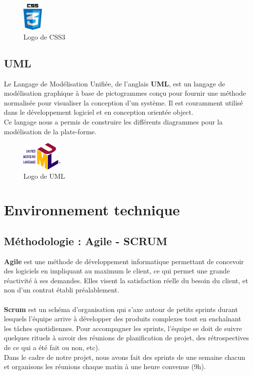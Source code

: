 \documentclass[12pt]{report}
\begin{document}
	    \begin{figure}[H]
	      \begin{center}
		\includegraphics[scale=0.3, width=1cm]{images/logoCss.png}
		\caption{Logo de CSS3}
	      \end{center}
	    \end{figure}

	  \subsection{UML}
	    Le Langage de Modélisation Unifiée, de l'anglais \textbf{UML}, est un langage de modélisation graphique à base de pictogrammes conçu pour fournir une méthode normalisée pour visualiser la conception d'un système. Il est couramment utilisé dans le développement logiciel et en conception orientée object.\cite{uml}
	    \\Ce langage nous a permis de construire les différents diagrammes pour la modélisation de la plate-forme.
	    
	    \begin{figure}[H]
	      \begin{center}
		\includegraphics[scale=0.4, width=2cm]{images/logoUml.png}
		\caption{Logo de UML}
	      \end{center}
	    \end{figure}
	    
	  \section{Environnement technique}
	  \subsection{Méthodologie : Agile - SCRUM}
	    \textbf{Agile} est une méthode de développement informatique permettant de concevoir des logiciels en impliquant au maximum le client, ce qui permet une grande réactivité à ses demandes. Elles visent la satisfaction réelle du besoin du client, et non d'un contrat établi préalablement.
	    \paragraph{}
	    \textbf{Scrum} est un schéma d’organisation qui s’axe autour de petits sprints durant lesquels l’équipe arrive à développer des produits complexes tout en enchaînant les tâches quotidiennes. Pour accompagner les sprints, l’équipe se doit de suivre quelques rituels à savoir des réunions de planification de projet, des rétrospectives de ce qui a été fait ou non, etc).\cite{agile_scrum}
	    \\Dans le cadre de notre projet, nous avons fait des sprints de une semaine chacun et organisons les réunions chaque matin à une heure convenue (9h).
	 
\end{document}
